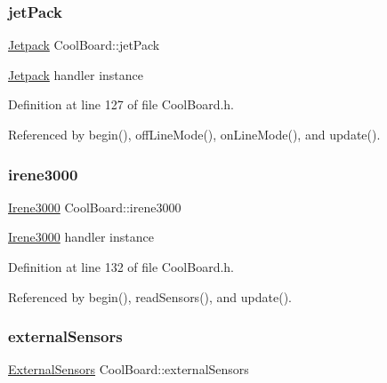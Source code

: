 \mbox{\label{class_cool_board_a30b1357881b01ccbec676856a91e48e9}} 
\subsubsection{\texorpdfstring{jet\+Pack}{jetPack}}
{\footnotesize\ttfamily \hyperlink{class_jetpack}{Jetpack} Cool\+Board\+::jet\+Pack\hspace{0.3cm}{\ttfamily [private]}}

\hyperlink{class_jetpack}{Jetpack} handler instance 

Definition at line 127 of file Cool\+Board.\+h.



Referenced by begin(), off\+Line\+Mode(), on\+Line\+Mode(), and update().

\mbox{\label{class_cool_board_ad103718ce316006c4695b8eb312eaf11}} 
\subsubsection{\texorpdfstring{irene3000}{irene3000}}
{\footnotesize\ttfamily \hyperlink{class_irene3000}{Irene3000} Cool\+Board\+::irene3000\hspace{0.3cm}{\ttfamily [private]}}

\hyperlink{class_irene3000}{Irene3000} handler instance 

Definition at line 132 of file Cool\+Board.\+h.



Referenced by begin(), read\+Sensors(), and update().

\mbox{\label{class_cool_board_a09e26264839c65873eb56af476eff6b2}} 
\subsubsection{\texorpdfstring{external\+Sensors}{externalSensors}}
{\footnotesize\ttfamily \hyperlink{class_external_sensors}{External\+Sensors} Cool\+Board\+::external\+Sensors\hspace{0.3cm}{\ttfamily [private]}}

